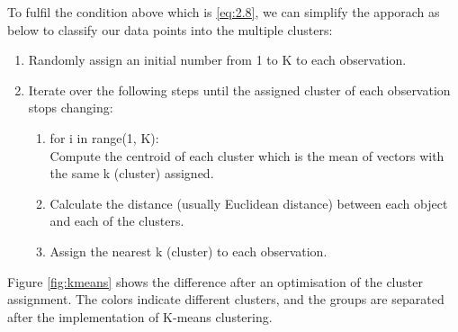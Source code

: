 \documentclass[11pt]{article} %
\theoremstyle{plain}
\theoremstyle{definition}
\begin{document}
To fulfil the condition above which is \eqref{eq:2.8}, we can simplify the apporach as below to classify our data points into the multiple clusters\cite{james/itsl:2009}:
{
  \begin{enumerate}
    \item Randomly assign an initial number from 1 to K to each observation.
    \item Iterate over the following steps until the assigned cluster of each observation stops changing:
    \begin{enumerate}
      \item for i in range(1, K): \\
      Compute the centroid of each cluster which is the mean of vectors with the same k (cluster) assigned.
      \item Calculate the distance (usually Euclidean distance) between each object and each of the clusters.
      \item  Assign the nearest k (cluster) to each observation.
    \end{enumerate}
  \end{enumerate}
}
Figure \ref{fig:kmeans} shows the difference after an optimisation of the cluster assignment. The colors indicate different clusters, and the groups are separated after the implementation of K-means clustering.
\end{document}
